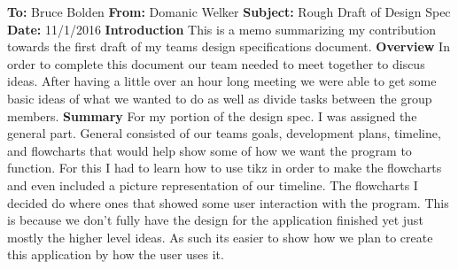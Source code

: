 \documentclass[12pt]{article}
\begin{document}
	\noindent
	\textbf{To:} Bruce Bolden \newline
	\textbf{From:} Domanic Welker \newline
	\textbf{Subject:} Rough Draft of Design Spec \newline
	\textbf{Date:} 11/1/2016 	\newline\newline
	\textbf{Introduction} \newline
	This is a memo summarizing my contribution towards the first draft of my teams design specifications document. \newline\newline
	\textbf{Overview}\newline
	In order to complete this document our team needed to meet together to discus ideas. After having a little over an hour long meeting we were able to get some basic ideas of what we 			wanted to do as well as divide tasks between the group members.\newline\newline
	\textbf{Summary}\newline
	For my portion of the design spec. I was assigned the general part. General consisted of our teams goals, development plans, timeline, and flowcharts that would help show some of how 			we want the program to function. For this I had to learn how to use tikz in order to make the flowcharts and even included a picture representation of our timeline. The flowcharts I decided   	do where ones that showed some user interaction with the program. This is because we don't fully have the design for the application finished yet just mostly the higher level ideas. As 			such its easier to show how we plan to create this application by how the user uses it. 
\end{document}
